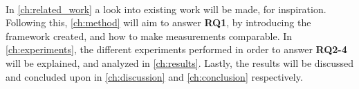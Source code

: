 \paragraph*{}
In \cref{ch:related_work} a look into existing work will be made, for inspiration. Following this, \cref{ch:method} will aim to answer \textbf{RQ1}, by introducing the framework created, and how to make measurements comparable. In \cref{ch:experiments}, the different experiments performed in order to answer \textbf{RQ2-4} will be explained, and analyzed in \cref{ch:results}. Lastly, the results will be discussed and concluded upon in \cref{ch:discussion} and \cref{ch:conclusion} respectively.








